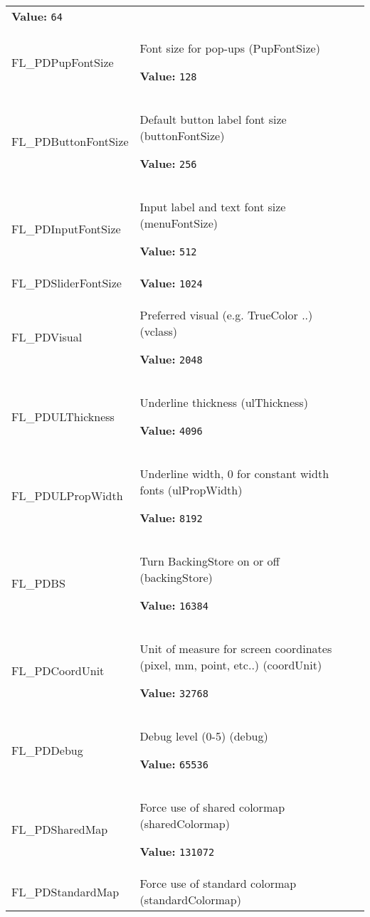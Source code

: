 \begin{longtable}{|p{\varnamewidth}|p{\vardescrwidth}|l}
\textbf{Value:} 
{\tt 64}&\\
\cline{1-2}
\raggedright F\-L\-\_\-P\-D\-P\-u\-p\-F\-o\-n\-t\-S\-i\-z\-e\- & \raggedright Font size for pop-ups (PupFontSize)

\textbf{Value:} 
{\tt 128}&\\
\cline{1-2}
\raggedright F\-L\-\_\-P\-D\-B\-u\-t\-t\-o\-n\-F\-o\-n\-t\-S\-i\-z\-e\- & \raggedright Default button label font size (buttonFontSize)

\textbf{Value:} 
{\tt 256}&\\
\cline{1-2}
\raggedright F\-L\-\_\-P\-D\-I\-n\-p\-u\-t\-F\-o\-n\-t\-S\-i\-z\-e\- & \raggedright Input label and text font size (menuFontSize)

\textbf{Value:} 
{\tt 512}&\\
\cline{1-2}
\raggedright F\-L\-\_\-P\-D\-S\-l\-i\-d\-e\-r\-F\-o\-n\-t\-S\-i\-z\-e\- & \raggedright \textbf{Value:} 
{\tt 1024}&\\
\cline{1-2}
\raggedright F\-L\-\_\-P\-D\-V\-i\-s\-u\-a\-l\- & \raggedright Preferred visual (e.g. TrueColor ..) (vclass)

\textbf{Value:} 
{\tt 2048}&\\
\cline{1-2}
\raggedright F\-L\-\_\-P\-D\-U\-L\-T\-h\-i\-c\-k\-n\-e\-s\-s\- & \raggedright Underline thickness (ulThickness)

\textbf{Value:} 
{\tt 4096}&\\
\cline{1-2}
\raggedright F\-L\-\_\-P\-D\-U\-L\-P\-r\-o\-p\-W\-i\-d\-t\-h\- & \raggedright Underline width, 0 for constant width fonts (ulPropWidth)

\textbf{Value:} 
{\tt 8192}&\\
\cline{1-2}
\raggedright F\-L\-\_\-P\-D\-B\-S\- & \raggedright Turn BackingStore on or off (backingStore)

\textbf{Value:} 
{\tt 16384}&\\
\cline{1-2}
\raggedright F\-L\-\_\-P\-D\-C\-o\-o\-r\-d\-U\-n\-i\-t\- & \raggedright Unit of measure for screen coordinates (pixel, mm, point, etc..)
(coordUnit)

\textbf{Value:} 
{\tt 32768}&\\
\cline{1-2}
\raggedright F\-L\-\_\-P\-D\-D\-e\-b\-u\-g\- & \raggedright Debug level (0-5) (debug)

\textbf{Value:} 
{\tt 65536}&\\
\cline{1-2}
\raggedright F\-L\-\_\-P\-D\-S\-h\-a\-r\-e\-d\-M\-a\-p\- & \raggedright Force use of shared colormap (sharedColormap)

\textbf{Value:} 
{\tt 131072}&\\
\cline{1-2}
\raggedright F\-L\-\_\-P\-D\-S\-t\-a\-n\-d\-a\-r\-d\-M\-a\-p\- & \raggedright Force use of standard colormap (standardColormap)


\end{longtable}
